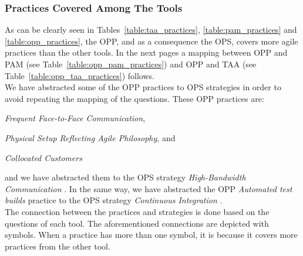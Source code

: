 \subsubsection[Tool Practices]{Practices Covered Among The Tools}

As can be clearly seen in Tables~\ref{table:taa_practices}, \ref{table:pam_practices} and \ref{table:opp_practices}, the \ac{OPP}, and as a consequence the \ac{OPS}, covers more agile practices than the other tools. In the next pages a mapping between \ac{OPP} and \ac{PAM} (see Table~\ref{table:opp_pam_practices}) and \ac{OPP} and \ac{TAA} (see Table~\ref{table:opp_taa_practices}) follows. \\

We have abstracted some of the \ac{OPP} practices to \ac{OPS} strategies in order to avoid repeating the mapping of the questions. These \ac{OPP} practices are: 
\begin{inparaenum} [a\upshape)]
	\item \textit{Frequent Face-to-Face Communication},
	\item \textit{Physical Setup Reflecting Agile Philosophy}, and
	\item \textit{Collocated Customers}
\end{inparaenum} and we have abstracted them to the \ac{OPS} strategy \textit{High-Bandwidth Communication}  \cite[p. 57]{sventha_dissertation}. In the same way, we have abstracted the \ac{OPP} \textit{Automated test builds} practice to the \ac{OPS} strategy \textit{Continuous Integration} \cite[p. 57]{sventha_dissertation}. \\

The connection between the practices and strategies is done based on the questions of each tool. The aforementioned connections are depicted with symbols. When a practice has more than one symbol, it is because it covers more practices from the other tool. \\

